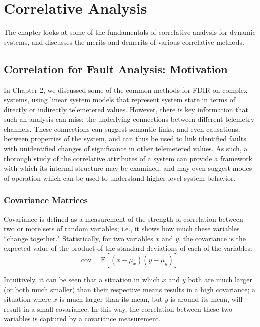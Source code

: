 \chapter{Correlative Analysis}

The chapter looks at some of the fundamentals of correlative analysis for dynamic systems, and discusses the merits and demerits of various correlative methods.

\section{Correlation for Fault Analysis: Motivation}

In Chapter 2, we discussed some of the common methods for FDIR on complex systems, using linear system models that represent system state in terms of directly or indirectly telemetered values. However, there is key information that such an analysis can miss: the underlying connections between different telemetry channels. These connections can suggest semantic links, and even causations, between properties of the system, and can thus be used to link identified faults with unidentified changes of significance in other telemetered values. As such, a thorough study of the correlative attributes of a system can provide a framework with which its internal structure may be examined, and may even suggest modes of operation which can be used to understand higher-level system behavior.

\subsection{Covariance Matrices}

Covariance is defined as a measurement of the strength of correlation between two or more sets of random variables; i.e., it shows how much these variables ``change together." Statistically, for two variables $x$ and $y$, the covariance is the expected value of the product of the standard deviations of each of the variables:
\begin{equation} \label{eq:cov}
\mathrm{cov} = \text{E}[(x - \mu_{x})(y - \mu_{y})]
\end{equation}

Intuitively, it can be seen that a situation in which $x$ and $y$ both are much larger (or both much smaller) than their respective means results in a high covariance; a situation where $x$ is much larger than its mean, but $y$ is around its mean, will result in a small covariance. In this way, the correlation between these two variables is captured by a covariance measurement.

